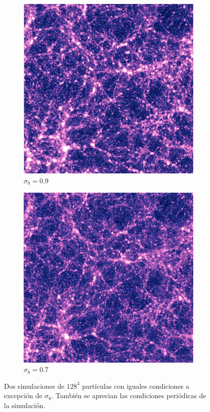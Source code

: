 \begin{figure}
	\centering
	\begin{subfigure}[b]{0.49\textwidth}
		\includegraphics[width=\textwidth]{Trabajo/res1}
		\caption{$\sigma_8=0.9$}
		\label{fig:sig9}
	\end{subfigure}
	\begin{subfigure}[b]{0.49\textwidth}
		\includegraphics[width=\textwidth]{Trabajo/res2}
		\caption{$\sigma_8=0.7$}
		\label{fig:sig7}
	\end{subfigure}
	\caption[Dos simulaciones de $128^3$ partículas con iguales condiciones a excepción de $\sigma_8$.]{Dos simulaciones de $128^3$ partículas con iguales condiciones a excepción de $\sigma_8$. También se aprecian las condiciones periódicas de la simulación.}
	\label{fig:sigma}
\end{figure}

